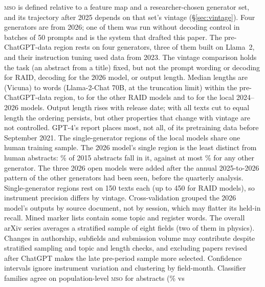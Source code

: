 \documentclass[11pt]{article}
\newcommand{\mso}{\textsc{mso}}
\begin{document}
\mso{} is defined relative to a feature map and a researcher-chosen generator set, and its trajectory after 2025
depends on that set's vintage (\S\ref{sec:vintage}). Four generators are from 2026; one of them was run without
decoding control in batches of 50 prompts and is the system that drafted this paper. The pre-ChatGPT-data region rests
on four generators, three of them built on Llama~2, and their instruction tuning used data from 2023. The vintage comparison holds the task (an abstract from a title) fixed, but not the prompt wording or decoding for RAID, decoding for the 2026 model, or output length. Median lengths are  (Vicuna) to  words (Llama-2-Chat 70B, at the truncation limit) within the pre-ChatGPT-data region,  to  for the other RAID models and  to  for the local 2024--2026 models. Output length rises with release date; with all texts cut to equal length the ordering persists, but other properties that change with vintage are not controlled. GPT-4's report places most, not all, of its pretraining data before September 2021. The single-generator regions of the local models share one human training sample. The 2026 model's single region is the least distinct from human abstracts: \% of 2015 abstracts fall in it, against at most \% for any other generator. The three 2026 open models were added after the annual 2025-to-2026 pattern of the other generators had been seen, before the quarterly analysis.
Single-generator regions rest on 150 texts each (up to 450 for RAID models), so instrument precision differs by vintage. Cross-validation grouped the 2026 model's outputs by source document, not by session, which may flatter its held-in recall. Mined marker lists contain some topic and register words. The overall arXiv series averages a stratified sample of eight fields
(two of them in physics). Changes in authorship, subfields and submission volume may contribute despite
stratified sampling and topic and length checks, and excluding papers revised after ChatGPT makes the late
pre-period sample more selected. Confidence intervals ignore instrument variation and clustering by field-month. Classifier families agree on population-level \mso{} for abstracts (\% vs
\end{document}
